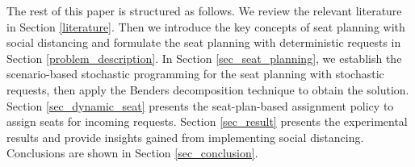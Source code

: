 The rest of this paper is structured as follows. We review the relevant literature in Section \ref{literature}. Then we introduce the key concepts of seat planning with social distancing and formulate the seat planning with deterministic requests in Section \ref{problem_description}. In Section \ref{sec_seat_planning}, we establish the scenario-based stochastic programming for the seat planning with stochastic requests, then apply the Benders decomposition technique to obtain the solution. Section \ref{sec_dynamic_seat} presents the seat-plan-based assignment policy to assign seats for incoming requests. Section \ref{sec_result} presents the experimental results and provide insights gained from implementing social distancing. Conclusions are shown in Section \ref{sec_conclusion}.
